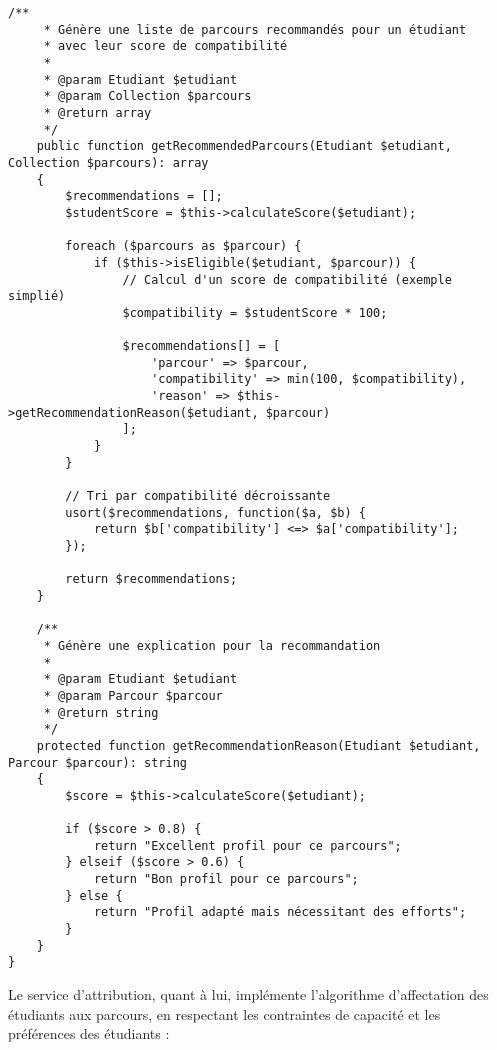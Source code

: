 \documentclass[french,12pt]{report} %
\begin{document}
\begin{lstlisting}[style=phpstyle,caption={EligibilityService - Calcul des scores d'éligibilité}]
    /**
     * Génère une liste de parcours recommandés pour un étudiant
     * avec leur score de compatibilité
     * 
     * @param Etudiant $etudiant
     * @param Collection $parcours
     * @return array
     */
    public function getRecommendedParcours(Etudiant $etudiant, Collection $parcours): array
    {
        $recommendations = [];
        $studentScore = $this->calculateScore($etudiant);
        
        foreach ($parcours as $parcour) {
            if ($this->isEligible($etudiant, $parcour)) {
                // Calcul d'un score de compatibilité (exemple simplié)
                $compatibility = $studentScore * 100;
                
                $recommendations[] = [
                    'parcour' => $parcour,
                    'compatibility' => min(100, $compatibility),
                    'reason' => $this->getRecommendationReason($etudiant, $parcour)
                ];
            }
        }
        
        // Tri par compatibilité décroissante
        usort($recommendations, function($a, $b) {
            return $b['compatibility'] <=> $a['compatibility'];
        });
        
        return $recommendations;
    }
    
    /**
     * Génère une explication pour la recommandation
     * 
     * @param Etudiant $etudiant
     * @param Parcour $parcour
     * @return string
     */
    protected function getRecommendationReason(Etudiant $etudiant, Parcour $parcour): string
    {
        $score = $this->calculateScore($etudiant);
        
        if ($score > 0.8) {
            return "Excellent profil pour ce parcours";
        } elseif ($score > 0.6) {
            return "Bon profil pour ce parcours";
        } else {
            return "Profil adapté mais nécessitant des efforts";
        }
    }
}
\end{lstlisting}

Le service d'attribution, quant à lui, implémente l'algorithme d'affectation des étudiants aux parcours, en respectant les contraintes de capacité et les préférences des étudiants :
\end{document}
